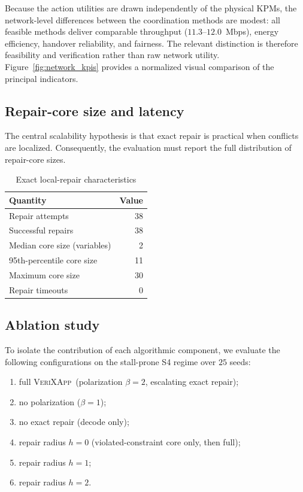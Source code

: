 \documentclass[pdflatex,sn-mathphys-num,iicol,oneside]{sn-jnl}
\newcommand{\method}{\textsc{VeriXApp}}
\begin{document}
Because the action utilities are drawn independently of the physical KPMs,
the network-level differences between the coordination methods are modest:
all feasible methods deliver comparable throughput ($11.3$--$12.0$~Mbps),
energy efficiency, handover reliability, and fairness. The relevant
distinction is therefore feasibility and verification rather than raw
network utility. Figure~\ref{fig:network_kpis} provides a normalized visual
comparison of the principal indicators.

\subsection{Repair-core size and latency}

The central scalability hypothesis is that exact repair is practical
when conflicts are localized. Consequently, the evaluation must
report the full distribution of repair-core sizes.

\begin{table}[t]
\centering
\caption{Exact local-repair characteristics}
\label{tab:repair}
\begin{tabular}{lr}
\toprule
Quantity & Value\\
\midrule
Repair attempts & 38\\
Successful repairs & 38\\
Median core size (variables) & 2\\
95th-percentile core size & 11\\
Maximum core size & 30\\
Repair timeouts & 0\\
\bottomrule
\end{tabular}
\end{table}

\subsection{Ablation study}

To isolate the contribution of each algorithmic component, we evaluate the
following configurations on the stall-prone S4 regime over $25$ seeds:

\begin{enumerate}
    \item full \method\ (polarization $\beta=2$, escalating exact repair);
    \item no polarization ($\beta=1$);
    \item no exact repair (decode only);
    \item repair radius $h=0$ (violated-constraint core only, then full);
    \item repair radius $h=1$;
    \item repair radius $h=2$.
\end{enumerate}
\end{document}
